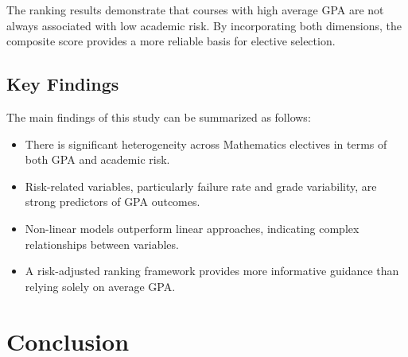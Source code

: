 \documentclass[a4paper,12pt,reqno]{amsart}
\numberwithin{equation}{section}
\theoremstyle{plain}
\theoremstyle{definition}
\begin{document}
The ranking results demonstrate that courses with high average GPA are not always associated with low academic risk. By incorporating both dimensions, the composite score provides a more reliable basis for elective selection.

\subsection{Key Findings}

The main findings of this study can be summarized as follows:
\begin{itemize}
    \item There is significant heterogeneity across Mathematics electives in terms of both GPA and academic risk.
    \item Risk-related variables, particularly failure rate and grade variability, are strong predictors of GPA outcomes.
    \item Non-linear models outperform linear approaches, indicating complex relationships between variables.
    \item A risk-adjusted ranking framework provides more informative guidance than relying solely on average GPA.
\end{itemize}
\section{Conclusion}
\printbibliography
\end{document}
